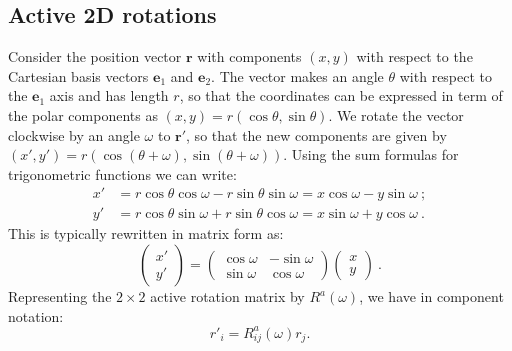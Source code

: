\subsection{Active 2D rotations} 
Consider the position vector $\mathbf{r}$ with components $(x,y)$ with respect to the Cartesian basis vectors $\mathbf{e}_1$ and $\mathbf{e}_2$.  The vector makes an angle $\theta$ with respect to the $\mathbf{e}_1$ axis and has length $r$, so that the coordinates can be expressed in term of the polar components as $(x,y) = r(\cos\theta,\sin\theta)$.  We rotate the vector clockwise by an angle $\omega$ to $\mathbf{r}'$, so that the new components are given by $(x',y') = r\left(\cos(\theta+\omega),\sin(\theta+\omega)\right)$.  Using the sum formulas for trigonometric functions we can write:
\begin{align*}
	x' &= r\cos\theta\cos\omega - r\sin\theta\sin\omega = x\cos\omega - y\sin\omega\ ;\\
	y' &= r\cos\theta\sin\omega + r\sin\theta\cos\omega = x\sin\omega + y\cos\omega\ .	
\end{align*}
This is typically rewritten in matrix form as:
\[
	\left(\begin{array}{c} x' \\ y'\end{array}\right) = 
	\left(\begin{array}{cc} \cos\omega & -\sin\omega\\ \sin\omega & \cos\omega\end{array}\right)
	\left(\begin{array}{c} x \\ y\end{array}\right) \ .	
\]
Representing the $2\times 2$ active rotation matrix by $R^a(\omega)$, we have in component notation:
\begin{equation}
	r'_i = R^a_{ij}(\omega) r_j.
\end{equation}

